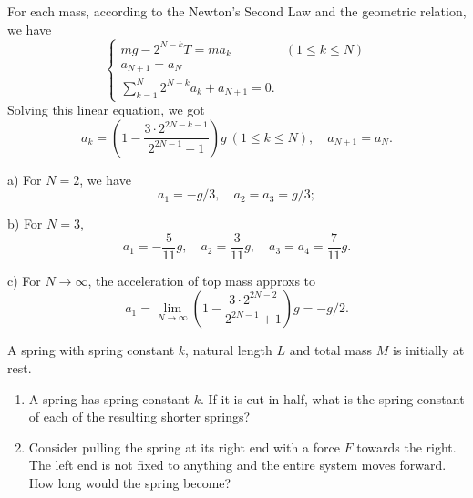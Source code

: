 \documentclass{article}
\begin{document}
\begin{solution}
\begin{figure}[H]
	\end{figure}
	For each mass, according to the Newton's Second Law and the geometric relation, we have
	\[ \begin{cases}
		mg - 2^{N-k}T = ma_k & (1\le k\le N) \\
		a_{N+1} = a_N \\
		\sum_{k=1}^{N}2^{N-k}a_k+a_{N+1} = 0.
	\end{cases} \]
	Solving this linear equation, we got
	\[ a_k = \left( 1 - \frac{3\cdot 2^{2N-k-1}}{2^{2N-1}+1} \right)g\ (1\le k\le N),\quad a_{N+1} = a_N. \]
	
	a) For $N=2$, we have
	\[ a_1 = -g/3, \quad a_2 = a_3 = g/3; \]

	b) For $N=3$, 
	\[ a_1 = -\frac{5}{11}g, \quad a_2 = \frac{3}{11}g, \quad a_3 = a_4 = \frac{7}{11}g. \]

	c) For $N\to\infty$, the acceleration of top mass approxs to 
	\[ a_1 = \lim_{N\to\infty}\left( 1-\frac{3\cdot2^{2N-2}}{2^{2N-1} + 1} \right)g = -g/2. \]
\end{solution}



\begin{problem}[optional]
A spring with spring constant $k$, natural length $L$ and total mass $M$ is initially at rest.

\begin{enumerate}
  \item[a)] A spring has spring constant $k$. If it is cut in half, what is the spring constant of each of the resulting shorter springs?
  \item[b)] Consider pulling the spring at its right end with a force $F$ towards the right. The left end is not fixed to anything and the entire system moves forward. How long would the spring become?
\end{enumerate}
\end{problem}
\end{document}
